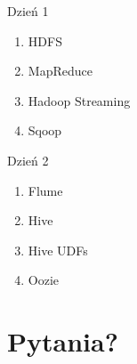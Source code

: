 \documentclass{beamer}
\begin{document}
\begin{frame}{Dzień 1}
	\begin{enumerate}
		\item HDFS
		\item MapReduce
		\item Hadoop Streaming
		\item Sqoop
	\end{enumerate}
\end{frame}
\begin{frame}{Dzień 2}
	\begin{enumerate}
		\item Flume
		\item Hive
		\item Hive UDFs
		\item Oozie
	\end{enumerate}
\end{frame}

\section{Pytania?}
\end{document}
